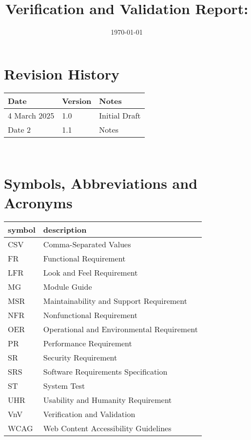\documentclass[12pt, titlepage]{article}
\begin{document}
\title{Verification and Validation Report: \progname} 
\author{\authname}
\date{\today}
	
\maketitle


\section{Revision History}

\begin{tabularx}{\textwidth}{p{3cm}p{2cm}X} \toprule {\bf Date} & {\bf Version}
& {\bf Notes}\\
\midrule
4 March 2025 & 1.0 & Initial Draft\\
Date 2 & 1.1 & Notes\\
\bottomrule
\end{tabularx}

~\newpage

\section{Symbols, Abbreviations and Acronyms}

\renewcommand{\arraystretch}{1.2}
\begin{tabular}{l l} 
  \toprule		
  \textbf{symbol} & \textbf{description}\\
  \midrule
  CSV & Comma-Separated Values\\
  FR & Functional Requirement\\
  LFR & Look and Feel Requirement\\
  MG & Module Guide\\
  MSR & Maintainability and Support Requirement\\
  NFR & Nonfunctional Requirement\\
  OER & Operational and Environmental Requirement\\
  PR & Performance Requirement\\
  SR & Security Requirement\\
  SRS & Software Requirements Specification\\
  ST & System Test\\
  UHR & Usability and Humanity Requirement\\
  VnV & Verification and Validation\\
  WCAG & Web Content Accessibility Guidelines\\
  \bottomrule
\end{tabular}\\
\end{document}
